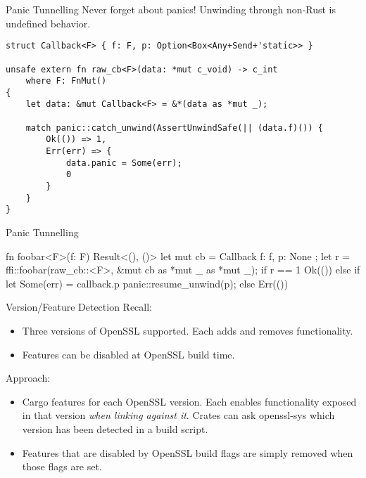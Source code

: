 \documentclass{beamer}
\begin{document}
\begin{frame}[fragile]{Panic Tunnelling}
    Never forget about panics! Unwinding through non-Rust is undefined
    behavior.

    \begin{verbatim}
struct Callback<F> { f: F, p: Option<Box<Any+Send+'static>> }

unsafe extern fn raw_cb<F>(data: *mut c_void) -> c_int
    where F: FnMut()
{
    let data: &mut Callback<F> = &*(data as *mut _);

    match panic::catch_unwind(AssertUnwindSafe(|| (data.f)()) {
        Ok(()) => 1,
        Err(err) => {
            data.panic = Some(err);
            0
        }
    }
}
    \end{verbatim}
\end{frame}

\begin{frame}[fragile]{Panic Tunnelling}
    \begin{rustcode}
fn foobar<F>(f: F) Result<(), ()> {
    let mut cb = Callback { f: f, p: None };
    let r = ffi::foobar(raw_cb::<F>,
                        &mut cb as *mut _ as *mut _);
    if r == 1 {
        Ok(())
    } else {
        if let Some(err) = callback.p {
            panic::resume_unwind(p);
        } else {
            Err(())
        }
    }
}
    \end{rustcode}
\end{frame}

\begin{frame}{Version/Feature Detection}
    Recall:
    \begin{itemize}
        \item Three versions of OpenSSL supported. Each adds and removes
            functionality.
        \item Features can be disabled at OpenSSL build time.
    \end{itemize}

    Approach:
    \begin{itemize}
        \item Cargo features for each OpenSSL version. Each enables
            functionality exposed in that version \emph{when linking against
            it}. Crates can ask openssl-sys which version has been detected in
            a build script.
        \item Features that are disabled by OpenSSL build flags are simply
            removed when those flags are set.
    \end{itemize}
\end{frame}
\end{document}
